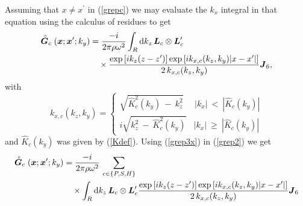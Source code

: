 \documentclass[11pt,a4paper]{article}
\newcommand{\bmi}[1]{\mbox{\boldmath$\mit #1$\unboldmath}}
\newcommand{\rf}[1]{\stackrel{\scriptscriptstyle _{\,\,\circ}}{ #1}}
\begin{document}
Assuming that $x \not = x^{\prime}$ in (\ref{grepc}) we may  evaluate the $k_x$ integral in
that equation using the calculus of residues to get
\begin{align} \label{grep3x}
\rf{\bmi G}_{c}({\bmi  x};{{\bmi  x}}^{\prime};k_y)&=
\frac{-i}{2{ \pi }\rho \omega^2}
\int_{{R}} {\rm d}{k}_z \,{\bmi L}_{c } \otimes {\bmi  L}_{c}^{\prime}\nonumber\\
&\quad\times\frac{\exp \left[{i {k}_z  ({z}-{z}^{\prime})}\right]
\exp \left[{i {k}_{x,c}({k}_z,{k}_y)  |{x}-{x}^{\prime}|}\right]
}{ 2\,{k}_{x,c}({k}_z,{k}_y)}{\bmi J}_{6},
\end{align}
with
\begin{equation}	\label{kxcDef}
	{k}_{x,c}({k}_{z},{k}_{y}) = \left\{
	\begin{array}{c}
	\sqrt {\hat{ K}_{c}^{2}({k}_{y})\ -\ {k}_{z}^{2}}\ \ \ \ \ \ |{k}_{x}|\ <\
	|\hat{K}_{c}({k}_{y})|\\
	i\sqrt {{k}_{z}^{ 2}\ -\ \hat{ K}_{c}^{2}({k}_{y})} \ \ \ \ |{k}_{x}|\ \ge   \
	|\hat{K}_{c}({k}_{y})|
\end{array}\right.
\end{equation}
and $\hat{ K}_{c}({k}_{y})$ was given by (\ref{Kdef}).
Using (\ref{grep3x}) in (\ref{grep2})
we get
\begin{align} \label{GxGRep}
\rf{\bmi G}_{c}({\bmi  x};{{\bmi  x}}^{\prime};k_y)&=
\frac{-i}{2{ \pi }\rho \omega^2}\,\sum\limits_{c\in \{P,S,H\}}\nonumber\\
&\quad\times
\int_{{R}} {\rm d}{k}_z \,{\bmi L}_{c } \otimes {\bmi  L}_{c}^{\prime}
\frac{\exp \left[{i {k}_z  ({z}-{z}^{\prime})}\right]
\exp \left[{i {k}_{x,c}({k}_z,{k}_y)  |{x}-{x}^{\prime}|}\right]
}{ 2\,{k}_{x,c}({k}_z,{k}_y)}{\bmi J}_{6}
\end{align}
\end{document}
